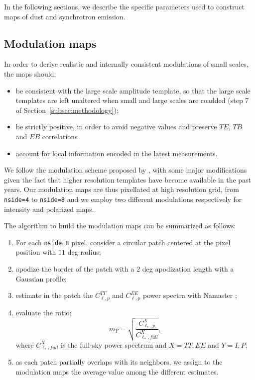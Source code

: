 In the following sections, we describe the specific parameters used to construct maps of dust and synchrotron emission.

\subsection{Modulation maps} \label{subsec:modulation}

In order to derive realistic and internally consistent   modulations of small scales, the maps should: 

\begin{itemize}
\item  be consistent with the large scale amplitude template, so that the large scale templates are left unaltered when small and large scales are coadded (step 7 of Section~\ref{subsec:methodology}); 
\item  be strictly positive, in order to avoid negative values and preserve $TE$, $TB$ and $EB$ correlations
\item   account  for local information encoded in the latest measurements. 
\end{itemize}

We follow the modulation scheme proposed by \citet{Thorne:2017}, with some major  modifications given the fact that  higher resolution templates have become available in the past years. Our  modulation maps are thus  pixellated at high resolution grid, from \texttt{nside=4}  \citep{Thorne:2017} to \texttt{nside=8} and we employ two different modulations respectively for intensity and polarized maps.

The algorithm to build the modulation maps can be summarized as follows: 
\begin{enumerate}
    \item For each \texttt{nside=8} pixel, consider a  circular patch centered at the pixel position with $11$ deg radius; 
    \item apodize the border of the patch with a $2$ deg apodization length with a Gaussian profile; 
    \item estimate  in the patch the $C^{TT}_{\ell, p}$ and $C^{EE}_{\ell,p}$  power spectra with Namaster \citet{Alonso:2019}; 
    \item evaluate the ratio:
    \begin{equation*}
        m_Y= \sqrt{\frac{C^{X}_{\ell_*,p}}{C^{X}_{\ell_*,full}}}, 
    \end{equation*}
    where $C^{X}_{\ell_*,full} $ is the full-sky power spectrum and $X= TT, EE$ and $Y=I, P$;
    \item  as each patch partially overlaps with its neighbors, we assign to the modulation maps the average value among the different estimates. 
\end{enumerate}
 
